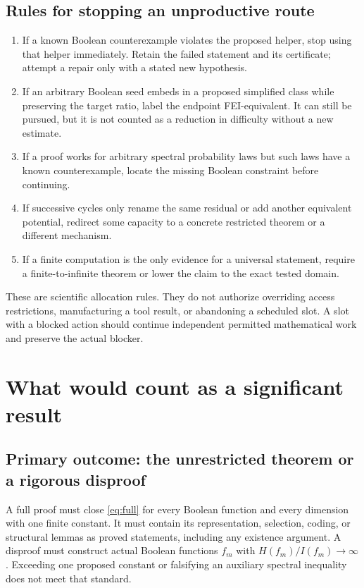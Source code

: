 \documentclass[11pt]{article}
\begin{document}
\subsection{Rules for stopping an unproductive route}

\begin{enumerate}
\item If a known Boolean counterexample violates the proposed helper, stop using that helper immediately. Retain the failed statement and its certificate; attempt a repair only with a stated new hypothesis.
\item If an arbitrary Boolean seed embeds in a proposed simplified class while preserving the target ratio, label the endpoint FEI-equivalent. It can still be pursued, but it is not counted as a reduction in difficulty without a new estimate.
\item If a proof works for arbitrary spectral probability laws but such laws have a known counterexample, locate the missing Boolean constraint before continuing.
\item If successive cycles only rename the same residual or add another equivalent potential, redirect some capacity to a concrete restricted theorem or a different mechanism.
\item If a finite computation is the only evidence for a universal statement, require a finite-to-infinite theorem or lower the claim to the exact tested domain.
\end{enumerate}

These are scientific allocation rules. They do not authorize overriding access restrictions, manufacturing a tool result, or abandoning a scheduled slot. A slot with a blocked action should continue independent permitted mathematical work and preserve the actual blocker.

\section{What would count as a significant result}

\subsection{Primary outcome: the unrestricted theorem or a rigorous disproof}

A full proof must close \eqref{eq:full} for every Boolean function and every dimension with one finite constant. It must contain its representation, selection, coding, or structural lemmas as proved statements, including any existence argument. A disproof must construct actual Boolean functions $f_m$ with $H(f_m)/I(f_m)\to\infty$. Exceeding one proposed constant or falsifying an auxiliary spectral inequality does not meet that standard.
\end{document}
